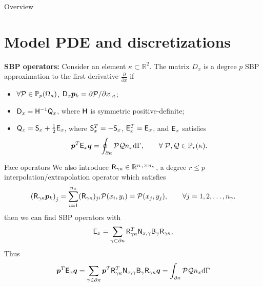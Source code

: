 \documentclass{beamer}
\begin{document}
\begin{frame}{Overview}
    \tableofcontents[hideallsubsections]
\end{frame}

\section{Model PDE and discretizations}

\begin{frame}
    \begin{definition}{}
        \textbf{SBP operators:} Consider an element $\kappa \subset \mathbb{R}^2$. The matrix $D_x$ is a degree $p$ SBP approximation to the first derivative $\frac{\partial}{\partial x}$ if 
        \begin{itemize}
            \item $\forall \mathcal{P} \in \mathbb{P}_{p}(\Omega_{\kappa})$, $\mathsf{D}_{x}\bm{p}_{k} = \partial \mathcal{P}/\partial x |_{\kappa}$;
            \item $\mathsf{D}_{x} = \mathsf{H}^{-1}\mathsf{Q}_{x}$, where $\mathsf{H}$ is symmetric positive-definite;
            \item $\mathsf{Q}_{x} = \mathsf{S}_{x} + \frac{1}{2}\mathsf{E}_{x}$, where $\mathsf{S}_{x}^T=-\mathsf{S}_{x}$, $\mathsf{E}_{x}^T=\mathsf{E}_{x}$, and
            $\mathsf{E}_{x}$ satisfies
            \begin{equation*}
            \bm{p}^T\mathsf{E}_{x}\bm{q} =\displaystyle\oint_{\partial{\kappa}} \mathcal{P} \mathcal{Q} n_{x}
            \mathrm{d}\Gamma,
            \qquad\forall\; \mathcal{P}, \mathcal{Q} \in \mathbb{P}_{r}({\kappa}).
            \end{equation*}
        \end{itemize}
    \end{definition}
\end{frame}

\begin{frame} {Face operators}
    We also introduce $\mathsf{R}_{\gamma\kappa} \in \mathbb{R}^{n_\gamma \times n_\kappa}$, a degree $r \le p$ interpolation/extrapolation operator which satisfies
    \begin{equation*}
    \left(\mathsf{R}_{\gamma\kappa} \bm{p}_{k}\right)_{j} = 
    \sum_{i=1}^{n_{\kappa}} (\mathsf{R}_{\gamma\kappa})_{ji} \mathcal{P}(x_{i},y_{i}) 
    = \mathcal{P}(x_{j},y_{j}),
    \qquad\forall j=1,2,\ldots,n_{\gamma}.
    \end{equation*}
    then we can find SBP operators with 
    \begin{equation*}
    \mathsf{E}_{x} = \sum_{\gamma \subset \partial \kappa} \mathsf{R}_{\gamma\kappa}^{T} \mathsf{N}_{x,\gamma} \mathsf{B}_{\gamma} \mathsf{R}_{\gamma\kappa},
    \end{equation*}
    Thus
    \begin{equation*}
    \bm{p}^T \mathsf{E}_{x} \bm{q} = \sum_{\gamma \in \partial\kappa} \bm{p}^T \mathsf{R}_{\gamma\kappa}^T\mathsf{N}_{x,\gamma}\mathsf{B}_{\gamma}\mathsf{R}_{\gamma\kappa}\bm{q} = \int_{\partial\kappa}\mathcal{P}\mathcal{Q} n_x\mathrm{d} \Gamma
    \end{equation*}
\end{frame}
\end{document}
